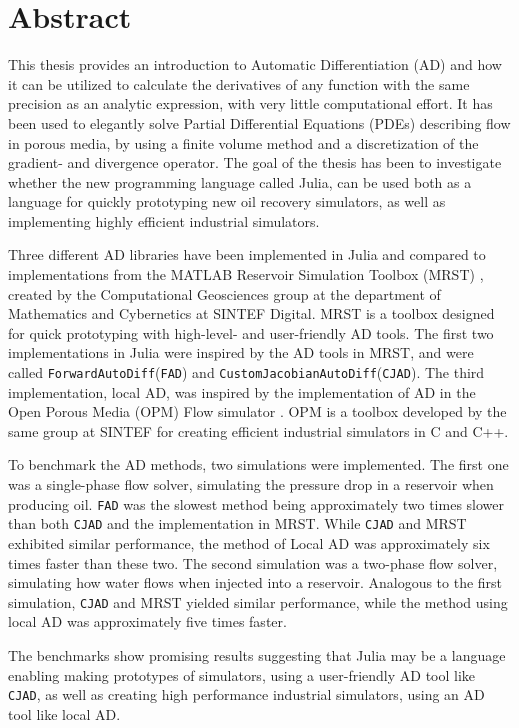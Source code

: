 \chapter*{Abstract}
This thesis provides an introduction to Automatic Differentiation (AD) and how it can be utilized to calculate the derivatives of any function with the same precision as an analytic expression, with very little computational effort. It has been used to elegantly solve Partial Differential Equations (PDEs) describing flow in porous media, by using a finite volume method and a discretization of the gradient- and divergence operator. The goal of the thesis has been to investigate whether the new programming language called Julia, can be used both as a language for quickly prototyping new oil recovery simulators, as well as implementing highly efficient industrial simulators.

Three different AD libraries have been implemented in Julia and compared to implementations from the MATLAB Reservoir Simulation Toolbox (MRST) \emph{\citep{mrstHomepage}}, created by the Computational Geosciences  group  at  the  department  of  Mathematics  and  Cybernetics  at  SINTEF Digital. MRST is a toolbox designed for quick prototyping with high-level- and user-friendly AD tools. The first two implementations in Julia were inspired by the AD tools in MRST, and were called \texttt{ForwardAutoDiff}(\texttt{FAD}) and \texttt{CustomJacobianAutoDiff}(\texttt{CJAD}). The third implementation, local AD, was inspired by the implementation of AD in the Open Porous Media (OPM) Flow simulator \emph{\citep{opm}}. OPM is a toolbox developed by the same group at SINTEF for creating efficient industrial simulators in C and C++. 

To benchmark the AD methods, two simulations were implemented. The first one was a single-phase flow solver, simulating the pressure drop in a reservoir when producing oil. \texttt{FAD} was the slowest method being approximately two times slower than both \texttt{CJAD} and the implementation in MRST. While \texttt{CJAD} and MRST exhibited similar performance, the method of Local AD was approximately six times faster than these two. The second simulation was a two-phase flow solver, simulating how water flows when injected into a reservoir. Analogous to the first simulation, \texttt{CJAD} and MRST yielded similar performance, while the method using local AD was approximately five times faster.

The benchmarks show promising results suggesting that Julia may be a language enabling making prototypes of simulators, using a user-friendly AD tool like \texttt{CJAD}, as well as creating high performance industrial simulators, using an AD tool like local AD.